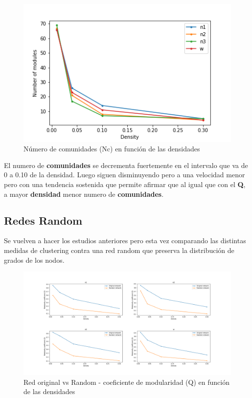 \begin{figure}[H]
    \centering
    \includegraphics[width=\textwidth]{img/2_number_mod.png}
    \caption{Número de comunidades (Nc) en función de las densidades}
    \label{fig:2_number_mod}
\end{figure}

El numero de \textbf{comunidades} se decrementa fuertemente en el intervalo que va de 0 a 0.10 de la densidad. Luego siguen disminuyendo pero a una velocidad menor pero con una tendencia sostenida que permite afirmar que al igual que con el \textbf{Q}, a mayor \textbf{densidad} menor numero de \textbf{comunidades}.




\subsection{Redes Random}

Se vuelven a hacer los estudios anteriores pero esta vez comparando las distintas medidas de clustering contra una red random que preserva la distribución de grados de los nodos.


\begin{figure}[H]
    \centering
    \includegraphics[width=\textwidth]{img/2_mod_coeff_vs_random.png}
    \caption{Red original vs Random - coeficiente de modularidad (Q) en función de las densidades}
    \label{fig:2_mod_coeff_vs_random}
\end{figure}

